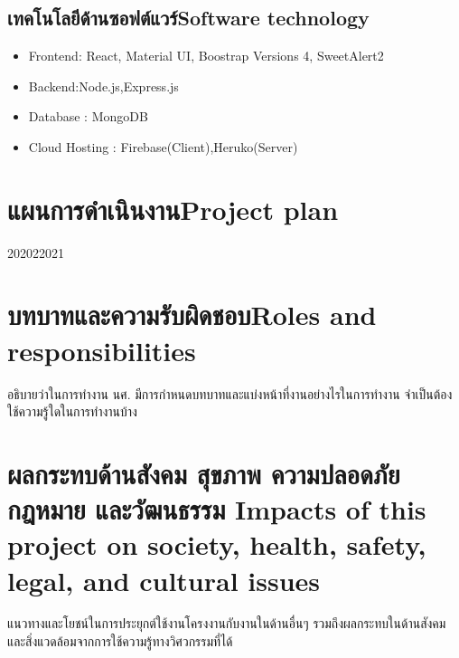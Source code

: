 \subsection{\ifcpe เทคโนโลยีด้านซอฟต์แวร์\else Software technology\fi}
\begin{itemize}
    \item Frontend: React, Material UI, Boostrap Versions 4, SweetAlert2		
    \item Backend:Node.js,Express.js
    \item Database : MongoDB
    \item  Cloud Hosting : Firebase(Client),Heruko(Server)
\end{itemize}



\section{\ifcpe แผนการดำเนินงาน\else Project plan\fi}

\begin{plan}{6}{2020}{2}{2021}
\end{plan}

\section{\ifcpe บทบาทและความรับผิดชอบ\else Roles and responsibilities\fi}
อธิบายว่าในการทำงาน นศ. มีการกำหนดบทบาทและแบ่งหน้าที่งานอย่างไรในการทำงาน จำเป็นต้องใช้ความรู้ใดในการทำงานบ้าง

\section{\ifcpe%
ผลกระทบด้านสังคม สุขภาพ ความปลอดภัย กฎหมาย และวัฒนธรรม
\else%
Impacts of this project on society, health, safety, legal, and cultural issues
\fi}

แนวทางและโยชน์ในการประยุกต์ใช้งานโครงงานกับงานในด้านอื่นๆ รวมถึงผลกระทบในด้านสังคมและสิ่งแวดล้อมจากการใช้ความรู้ทางวิศวกรรมที่ได้
